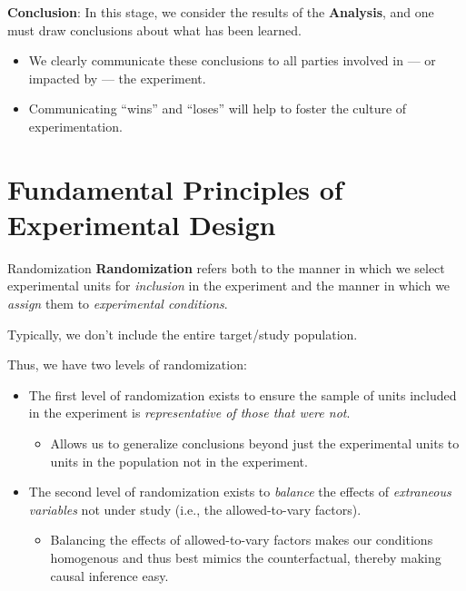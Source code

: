 \begin{framed}
    \textbf{Conclusion}: In this stage, we consider the results of the \textbf{Analysis},
    and one must draw conclusions about what has been learned.
    \begin{itemize}
        \item We clearly communicate these conclusions to all parties involved
              in --- or impacted by --- the experiment.
        \item Communicating ``wins'' and ``loses'' will help to foster the culture
              of experimentation.
    \end{itemize}
\end{framed}
\section{Fundamental Principles of Experimental Design}
\begin{Definition}{Randomization}{}
    \textbf{Randomization} refers both to the manner in which we select experimental units
    for \emph{inclusion} in the experiment and the manner in which we \emph{assign} them
    to \emph{experimental conditions}.
\end{Definition}
\begin{Remark}{}{}
    Typically, we don't include the entire target/study population.
\end{Remark}
Thus, we have two levels of randomization:
\begin{itemize}
    \item The first level of randomization exists to ensure the sample of units included in
          the experiment is \emph{representative of those that were not}.
          \begin{itemize}
              \item Allows us to generalize conclusions beyond just the experimental units to units
                    in the population not in the experiment.
          \end{itemize}
    \item The second level of randomization exists to \emph{balance} the effects of \emph{extraneous variables}
          not under study (i.e., the allowed-to-vary factors).
          \begin{itemize}
              \item Balancing the effects of allowed-to-vary factors makes our conditions homogenous
                    and thus best mimics the counterfactual, thereby making causal inference easy.
          \end{itemize}
\end{itemize}
